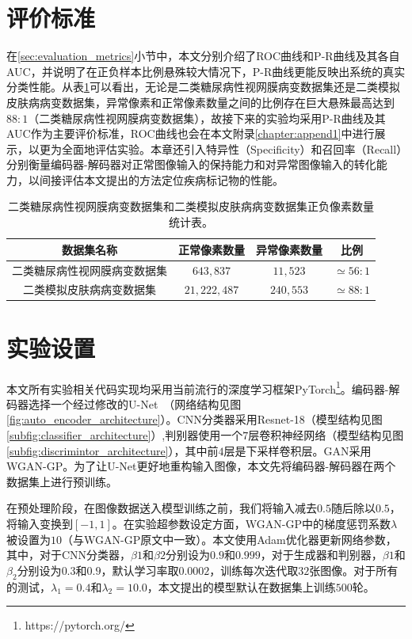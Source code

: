 \section{评价标准}\label{sec:exper_evaluation_metrics}
在\ref{sec:evaluation_metrics}小节中，本文分别介绍了ROC曲线和P-R曲线及其各自AUC，并说明了在正负样本比例悬殊较大情况下，P-R曲线更能反映出系统的真实分类性能。从表\ref{tab:bin_ds_pixel_freqs}可以看出，无论是二类糖尿病性视网膜病变数据集还是二类模拟皮肤病病变数据集，异常像素和正常像素数量之间的比例存在巨大悬殊最高达到$88:1$（二类糖尿病性视网膜病变数据集），故接下来的实验均采用P-R曲线及其AUC作为主要评价标准，ROC曲线也会在本文附录\ref{chapter:append1}中进行展示，以更为全面地评估实验。本章还引入特异性（Specificity）和召回率（Recall）分别衡量编码器-解码器对正常图像输入的保持能力和对异常图像输入的转化能力，以间接评估本文提出的方法定位疾病标记物的性能。
\begin{table}[h]
	\centering
	\caption[本章实验数据集正负像素数量统计表]{二类糖尿病性视网膜病变数据集和二类模拟皮肤病病变数据集正负像素数量统计表。}
	\label{tab:bin_ds_pixel_freqs}
	\begin{tabular}{c|c|c|c}
		\toprule[2pt]
		数据集名称 & 正常像素数量 & 异常像素数量 & 比例 \\
		\midrule[2pt]
		二类糖尿病性视网膜病变数据集&  $643,837$ & $11,523$ & $\simeq 56: 1$ \\ \hline
		二类模拟皮肤病病变数据集 & $21,222,487$ & $240,553$ & $\simeq 88: 1$ \\
		\bottomrule[2pt]
	\end{tabular}
\end{table}
\section{实验设置}\label{sec:exper_setting}
本文所有实验相关代码实现均采用当前流行的深度学习框架PyTorch\footnote{https://pytorch.org/}。编码器-解码器选择一个经过修改的U-Net~\cite{iglovikov2018ternausnet}（网络结构见图\ref{fig:auto_encoder_architecture}）。CNN分类器采用Resnet-18（模型结构见图\ref{subfig:classifier_architecture}）,判别器使用一个$7$层卷积神经网络（模型结构见图\ref{subfig:discrimintor_architecture}），其中前$4$层是下采样卷积层。GAN采用WGAN-GP。为了让U-Net更好地重构输入图像，本文先将编码器-解码器在两个数据集上进行预训练。

在预处理阶段，在图像数据送入模型训练之前，我们将输入减去$0.5$随后除以$0.5$，将输入变换到$[-1,1]$。在实验超参数设定方面，WGAN-GP中的梯度惩罚系数$\lambda$被设置为$10$（与WGAN-GP原文中一致）。本文使用Adam优化器更新网络参数，其中，对于CNN分类器，$\beta1$和$\beta2$分别设为$0.9$和$0.999$，对于生成器和判别器，$\beta1$和$\beta_2$分别设为$0.3$和$0.9$，默认学习率取$0.0002$，训练每次迭代取$32$张图像。对于所有的测试，$\lambda_1 = 0.4$和$\lambda_{2} = 10.0$，本文提出的模型默认在数据集上训练$500$轮。

